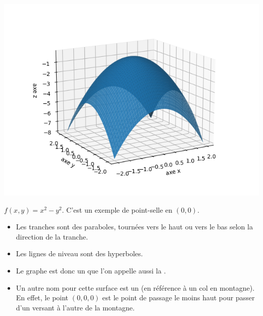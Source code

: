 \begin{center}
\includegraphics[scale=\myscale,scale=0.5]{figures/fonctions-extrem-2a}
\end{center}

	



$f(x,y) = x^2 - y^2$. C'est un exemple de point-selle en $(0,0)$.

\begin{itemize}
  \item Les tranches sont des paraboles, tournées vers le haut ou vers le bas selon la direction de la tranche.
  \item Les lignes de niveau sont des hyperboles.
  \item Le graphe est donc un  que l'on appelle aussi la .
  \item Un autre nom pour cette surface est un  (en référence à un col en montagne). 
  En effet, le point $(0,0,0)$ est le point de passage le moins haut pour passer d'un versant à l'autre de la montagne. 
\end{itemize}

